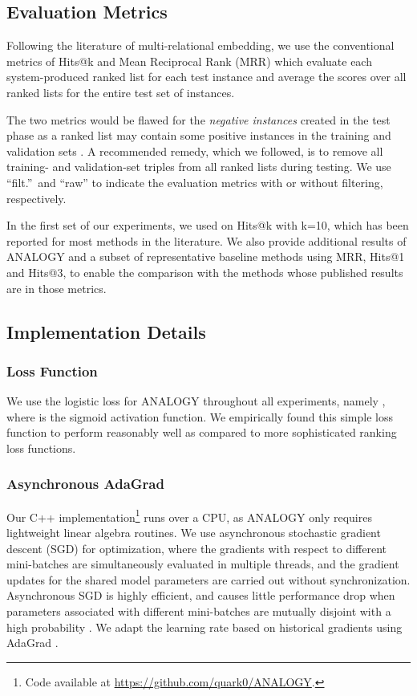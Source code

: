 \documentclass{article}
\begin{document}
\subsection{Evaluation Metrics}

Following the literature of multi-relational embedding, we use the conventional metrics of Hits@k and Mean Reciprocal Rank (MRR) which evaluate each system-produced ranked list for each test instance and average the scores over all ranked lists for the entire test set of instances.

The two metrics would be flawed for the \textit{negative instances} created in the test phase as a ranked list may contain some positive instances in the training and validation sets \cite{bordes2013translating}.
A recommended remedy, which we followed, is to remove all training- and validation-set triples from all ranked lists during testing. 
We use ``filt.''\ and ``raw'' to indicate the evaluation metrics with or without filtering, respectively.

In the first set of our experiments,
we used on Hits@k with k=10,
which has been reported for most methods in the literature.  We also provide additional results of ANALOGY and a subset of representative baseline methods using MRR, Hits@1 and Hits@3, to enable the comparison with the methods whose published results are in those metrics.



\subsection{Implementation Details}
\subsubsection{Loss Function}
We use the logistic loss for ANALOGY throughout all experiments, namely
,
where  is the sigmoid activation function.
We empirically found this simple loss function to perform reasonably well as compared
to more sophisticated ranking loss functions.

\subsubsection{Asynchronous AdaGrad}
Our C++ implementation\footnote{Code available at \href{https://github.com/quark0/ANALOGY}{https://github.com/quark0/ANALOGY}.} runs over a CPU, as ANALOGY only requires lightweight linear algebra routines.
We use asynchronous stochastic gradient descent (SGD) for optimization,
where the gradients with respect to different mini-batches are simultaneously evaluated in multiple threads,
and the gradient updates for the shared model parameters are carried out without synchronization.
Asynchronous SGD is highly efficient,
and causes little performance drop when parameters associated with different mini-batches are mutually disjoint with a high probability
\cite{recht2011hogwild}.
We adapt the learning rate based on historical gradients
using AdaGrad \cite{duchi2011adaptive}.
\end{document}
